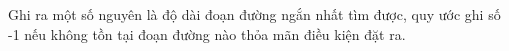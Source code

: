 Ghi ra một số nguyên là độ dài đoạn đường ngắn nhất tìm được, quy ước ghi số -1 nếu không tồn tại đoạn đường nào thỏa mãn điều kiện đặt ra.